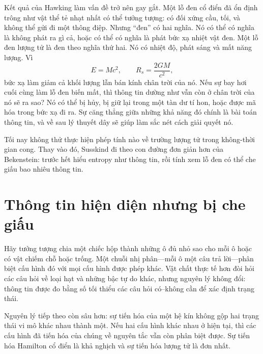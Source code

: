 Kết quả của Hawking làm vấn đề trở nên gay gắt. Một lỗ đen cổ điển đã ổn định trông như vật thể tẻ nhạt nhất có thể tưởng tượng: có đối xứng cầu, tối, và không thể gửi đi một thông điệp. Nhưng ``đen'' có hai nghĩa. Nó có thể có nghĩa là không phát ra gì cả, hoặc có thể có nghĩa là phát bức xạ nhiệt vật đen. Một lỗ đen lượng tử là đen theo nghĩa thứ hai. Nó có nhiệt độ, phát sáng và mất năng lượng. Vì
\begin{equation}
E=Mc^2,
\qquad
R_s=\frac{2GM}{c^2},
\end{equation}
bức xạ làm giảm cả khối lượng lẫn bán kính chân trời của nó. Nếu sự bay hơi cuối cùng làm lỗ đen biến mất, thì thông tin dường như vẫn còn ở chân trời của nó sẽ ra sao? Nó có thể bị hủy, bị giữ lại trong một tàn dư tí hon, hoặc được mã hóa trong bức xạ đi ra. Sự căng thẳng giữa những khả năng đó chính là bài toán thông tin, và về sau lý thuyết dây sẽ giúp làm sắc nét cách giải quyết nó.

Tối nay không thử thực hiện phép tính nào về trường lượng tử trong không-thời gian cong. Thay vào đó, Susskind đi theo con đường đơn giản hơn của Bekenstein: trước hết hiểu entropy như thông tin, rồi tính xem lỗ đen có thể che giấu bao nhiêu thông tin.

\section{Thông tin hiện diện nhưng bị che giấu}

Hãy tưởng tượng chia một chiếc hộp thành những ô đủ nhỏ sao cho mỗi ô hoặc có vật chiếm chỗ hoặc trống. Một chuỗi nhị phân---mỗi ô một câu trả lời---phân biệt cấu hình đó với mọi cấu hình được phép khác. Vật chất thực tế hơn đòi hỏi các câu hỏi về loại hạt và những bậc tự do khác, nhưng nguyên lý không đổi: thông tin được đo bằng số tối thiểu các câu hỏi có--không cần để xác định trạng thái.

\begin{classroomqa}
\end{classroomqa}

Nguyên lý tiếp theo còn sâu hơn: sự tiến hóa của một hệ kín không gộp hai trạng thái vi mô khác nhau thành một. Nếu hai cấu hình khác nhau ở hiện tại, thì các cấu hình đã tiến hóa của chúng về nguyên tắc vẫn còn phân biệt được. Sự tiến hóa Hamilton cổ điển là khả nghịch và sự tiến hóa lượng tử là đơn nhất.

